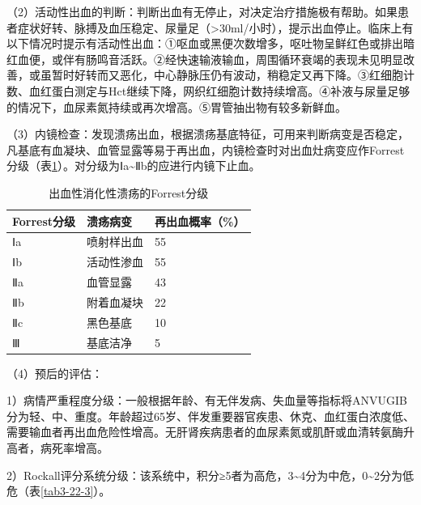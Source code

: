 （2）活动性出血的判断：判断出血有无停止，对决定治疗措施极有帮助。如果患者症状好转、脉搏及血压稳定、尿量足（\textgreater{}30ml/小时），提示出血停止。临床上有以下情况时提示有活动性出血：①呕血或黑便次数增多，呕吐物呈鲜红色或排出暗红血便，或伴有肠鸣音活跃。②经快速输液输血，周围循环衰竭的表现未见明显改善，或虽暂时好转而又恶化，中心静脉压仍有波动，稍稳定又再下降。③红细胞计数、血红蛋白测定与Hct继续下降，网织红细胞计数持续增高。④补液与尿量足够的情况下，血尿素氮持续或再次增高。⑤胃管抽出物有较多新鲜血。

（3）内镜检查：发现溃疡出血，根据溃疡基底特征，可用来判断病变是否稳定，凡基底有血凝块、血管显露等易于再出血，内镜检查时对出血灶病变应作Forrest分级（表\ref{tab3-22-2}）。对分级为Ⅰa\textasciitilde{}Ⅱb的应进行内镜下止血。

\begin{table}[htbp]
    \centering
    \caption{出血性消化性溃疡的Forrest分级}
    \label{tab3-22-2}
    \begin{tabular}{lll}
\toprule
Forrest分级 & 溃疡病变 & 再出血概率（\%）\tabularnewline
\midrule
Ⅰa & 喷射样出血 & 55\tabularnewline
Ⅰb & 活动性渗血 & 55\tabularnewline
Ⅱa & 血管显露 & 43\tabularnewline
Ⅱb & 附着血凝块 & 22\tabularnewline
Ⅱc & 黑色基底 & 10\tabularnewline
Ⅲ & 基底洁净 & 5\tabularnewline
\bottomrule
    \end{tabular}
\end{table}

（4）预后的评估：

1）病情严重程度分级：一般根据年龄、有无伴发病、失血量等指标将ANVUGIB分为轻、中、重度。年龄超过65岁、伴发重要器官疾患、休克、血红蛋白浓度低、需要输血者再出血危险性增高。无肝肾疾病患者的血尿素氮或肌酐或血清转氨酶升高者，病死率增高。

2）Rockall评分系统分级：该系统中，积分≥5者为高危，3\textasciitilde{}4分为中危，0\textasciitilde{}2分为低危（表\ref{tab3-22-3}）。

